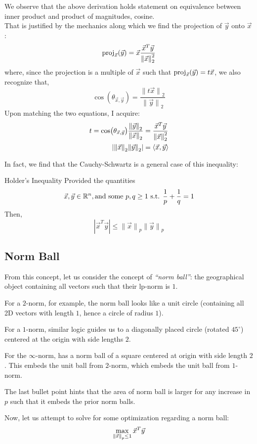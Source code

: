 We observe that the above derivation holds statement on equivalence between inner product and product of magnitudes, cosine. \\
That is justified by the mechanics along which we find the projection of $\vec{y}$ onto $\vec{x}$:
\[
    \proj{\vec{x}}{\vec{y}} = \vec{x} \frac{\vec{x}^T\vec{y}}{{\lVert \vec{x} \rVert}_2^2}
\]
where, since the projection is a multiple of $\vec{x}$ such that $\proj{\vec{x}}{\vec{y}} = t\vec{x}$, we also recognize that,
\[
    \cos(\theta_{\vec{x}, \vec{y}}) = \frac{{\lVert t\vec{x} \rVert}_2}{{\lVert \vec{y} \rVert}_2}
\]
Upon matching the two equations, I acquire:
\begin{align*}
    t = \cos(\theta_{\vec{x}, \vec{y}}) \frac{\pnorm{\vec{y}}{2}}{\pnorm{\vec{x}}{2}} &= \frac{\vec{x}^T\vec{y}}{\pnorm[2]{\vec{x}}{2}} \\
    |{\lVert \vec{x} \rVert}_2 {\lVert \vec{y} \rVert}_2| &= \langle \vec{x}, \vec{y} \rangle
\end{align*}

In fact, we find that the Cauchy-Schwartz is a general case of this inequality:
\begin{ln-define}{Holder's Inequality}{}
    Provided the quantities
    \[\vec{x}, \vec{y} \in \R^n, \text{and some } p, q \geq 1 \text{ s.t. } \frac{1}{p} + \frac{1}{q} = 1\]
    Then, 
    \[|\vec{x}^T \vec{y}| \leq {\lVert \vec{x} \rVert}_p{\lVert \vec{y} \rVert}_p\]
\end{ln-define}

\subsection{Norm Ball}
From this concept, let us consider the concept of \textit{``norm ball''}: the geographical object containing all vectors such that their lp-norm is $1$.

\begin{bindenum}
    \item For a $2$-norm, for example, the norm ball looks like a unit circle (containing all 2D vectors with length $1$, hence a circle of radius $1$).
    \item For a $1$-norm, similar logic guides us to a diagonally placed circle (rotated $45^\circ$) centered at the origin with side lengths $2$.
    \item For the $\infty$-norm, has a norm ball of a square centered at origin with side length $2$. This embeds the unit ball from $2$-norm, which embeds the unit ball from $1$-norm.
\end{bindenum}
The last bullet point hints that the area of norm ball is larger for any increase in $p$ such that it embeds the prior norm balls.
\par
Now, let us attempt to solve for some optimization regarding a norm ball:
\[\max_{\pnorm{\vec{x}}{p} \leq 1} \vec{x}^T \vec{y}\]

